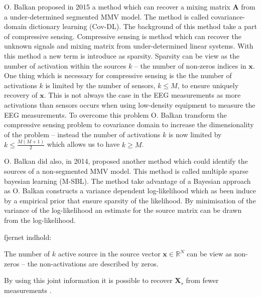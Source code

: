       


O. Balkan \cite{Balkan2015} proposed in 2015 a method which can recover a mixing matrix $\mathbf{A}$ from a under-determined segmented MMV model. 
The method is called covariance-domain dictionary learning (Cov-DL).
The background of this method take a part of compressive sensing. 
Compressive sensing is method which can recover the unknown signals and mixing matrix from under-determined linear systems. 
With this method a new term is introduce as sparsity. Sparsity can be view as the number of activation within the sources $k$ -- the number of non-zeros indices in $\mathbf{x}$.
One thing which is necessary for compressive sensing is the the number of activations $k$ is limited by the number of sensors, $k \leq M$, to ensure uniquely recovery of $\mathbf{x}$.
This is not always the case in the EEG measurements as more activations than sensors occurs when using low-density equipment to measure the EEG measurements.
To overcome this problem O. Balkan transform the compressive sensing problem to covariance domain to increase the dimensionality of the problem -- instead the number of activations $k$ is now limited by $k \leq \frac{M(M+1)}{2}$ which allows us to have $k \geq M$.

O. Balkan \cite{Balkan2014} did also, in 2014, proposed another method which could identify the sources of a non-segmented MMV model. 
This method is called multiple sparse bayesian learning (M-SBL).
The method take advantage of a Bayesian approach as O. Balkan constructs a variance dependent log-likelihood which as been induce by a empirical prior that ensure sparsity of the likelihood. 
By minimisation of the variance of the log-likelihood an estimate for the source matrix can be drawn from the log-likelihood.


fjernet indhold:


The number of $k$ active source in the source vector $\mathbf{x} \in \mathbb{R}^N$ can be view as non-zeros -- the non-activations are described by zeros. 

By using this joint information it is possible to recover $\mathbf{X}_s$ from fewer measurements \cite[p. 43]{CS}.

